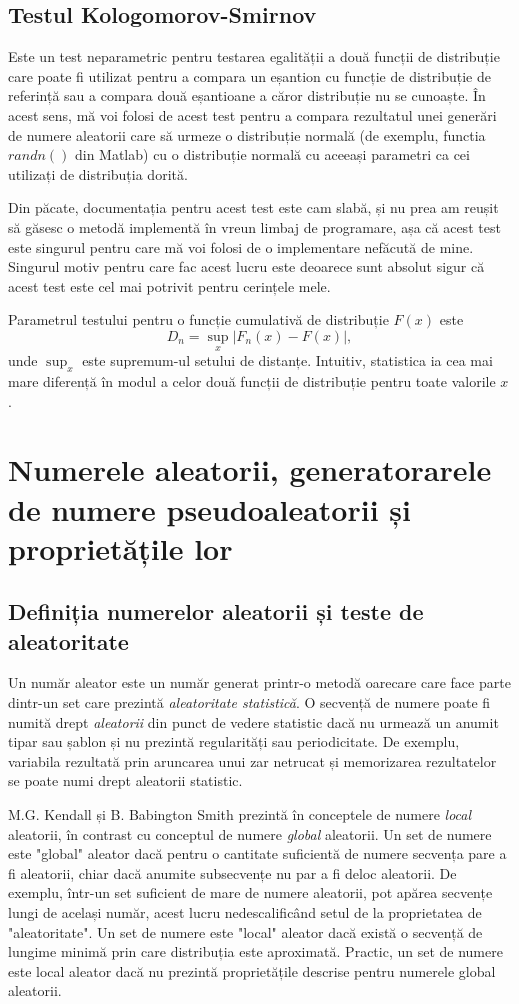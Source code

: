 \subsection{Testul Kologomorov-Smirnov}

Este un test neparametric pentru testarea egalității a două funcții de distribuție care poate fi utilizat pentru a compara un eșantion cu funcție de distribuție de referință sau a compara două eșantioane a căror distribuție nu se cunoaște. În acest sens, mă voi folosi de acest test pentru a compara rezultatul unei generări de numere aleatorii care să urmeze o distribuție normală (de exemplu, functia $randn()$ din Matlab) cu o distribuție normală cu aceeași parametri ca cei utilizați de distribuția dorită.

Din păcate, documentația pentru acest test este cam slabă, și nu prea am reușit să găsesc o metodă implementă în vreun limbaj de programare, așa că acest test este singurul pentru care mă voi folosi de o implementare nefăcută de mine. Singurul motiv pentru care fac acest lucru este deoarece sunt absolut sigur că acest test este cel mai potrivit pentru cerințele mele.

Parametrul testului pentru o funcție cumulativă de distribuție $F(x)$ este
\[
D_n = \sup_x |F_n(x) - F(x)|,
\]
unde $\sup_x$ este supremum-ul setului de distanțe. Intuitiv, statistica ia cea mai mare diferență în modul a celor două funcții de distribuție pentru toate valorile $x$.

\pagebreak

\section{Numerele aleatorii, generatorarele de numere pseudoaleatorii și proprietățile lor}
\subsection{Definiția numerelor aleatorii și teste de aleatoritate}
Un număr aleator este un număr generat printr-o metodă oarecare care face parte dintr-un set care prezintă \textit{aleatoritate statistică}. O secvență de numere poate fi numită drept \textit{aleatorii} din punct de vedere statistic dacă nu urmează un anumit tipar sau șablon și nu prezintă regularități sau periodicitate. De exemplu, variabila rezultată prin aruncarea unui zar netrucat și memorizarea rezultatelor se poate numi drept aleatorii statistic. 

M.G. Kendall și B. Babington Smith prezintă în \cite{MGKendallBBSmithRandomness}
conceptele de numere \textit{local} aleatorii, în contrast cu conceptul de numere \textit{global} aleatorii. Un set de numere este "global" aleator dacă pentru o cantitate suficientă de numere secvența pare a fi aleatorii, chiar dacă anumite subsecvențe nu par a fi deloc aleatorii. De exemplu, într-un set suficient de mare de numere aleatorii, pot apărea secvențe lungi de același număr, acest lucru nedescalificând setul de la proprietatea de "aleatoritate". Un set de numere este "local" aleator dacă există o secvență de lungime minimă prin care distribuția este aproximată. Practic, un set de numere este local aleator dacă nu prezintă proprietățile descrise pentru numerele global aleatorii. 

